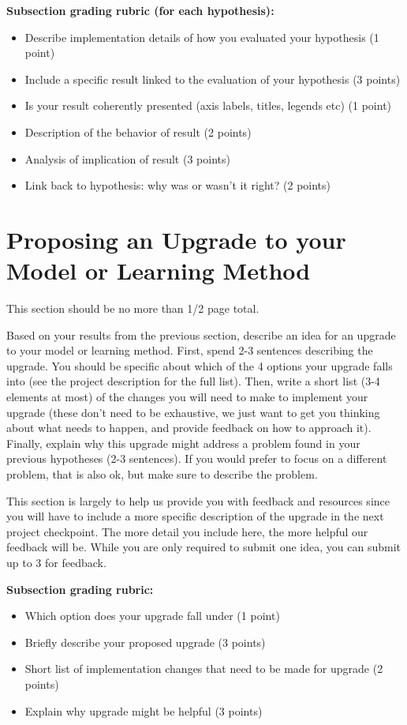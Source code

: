 \documentclass[12pt]{article}
\begin{document}
\textbf{Subsection grading rubric (for each hypothesis):}
\begin{itemize}
	\item Describe implementation details of how you evaluated your hypothesis (1 point)
	\item Include a specific result linked to the evaluation of your hypothesis (3 points)
	\item Is your result coherently presented (axis labels, titles, legends etc) (1 point)
	\item Description of the behavior of result (2 points)
	\item Analysis of implication of result (3 points)
	\item Link back to hypothesis: why was or wasn't it right? (2 points)
\end{itemize}

\section{Proposing an Upgrade to your Model or Learning Method}

This section should be no more than 1/2 page total.

Based on your results from the previous section, describe an idea for an upgrade to your model or learning method.  First, spend 2-3 sentences describing the upgrade.   You should be specific about which of the 4 options your upgrade falls into (see the project description for the full list).  Then, write a short list (3-4 elements at most) of the changes you will need to make to implement your upgrade (these don't need to be exhaustive, we just want to get you thinking about what needs to happen, and provide feedback on how to approach it).  Finally, explain why this upgrade might address a problem found in your previous hypotheses (2-3 sentences).  If you would prefer to focus on a different problem, that is also ok, but make sure to describe the problem.  

This section is largely to help us provide you with feedback and resources since you will have to include a more specific description of the upgrade in the next project checkpoint.  The more detail you include here, the more helpful our feedback will be.  While you are only required to submit one idea, you can submit up to 3 for feedback.  

\textbf{Subsection grading rubric:}
\begin{itemize}
	\item Which option does your upgrade fall under (1 point)
	\item Briefly describe your proposed upgrade (3 points)
	\item Short list of implementation changes that need to be made for upgrade (2 points)
	\item Explain why upgrade might be helpful (3 points)
\end{itemize}
\end{document}
